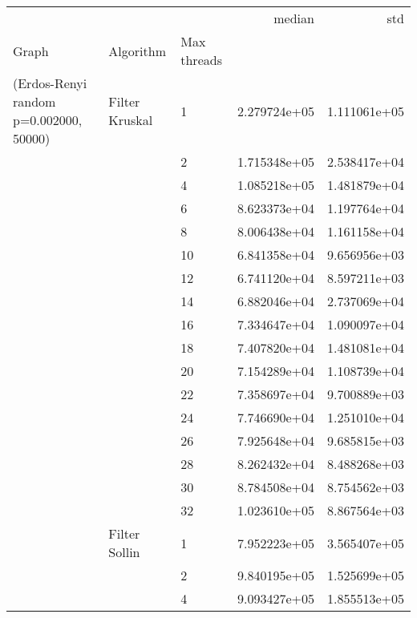 \begin{tabular}{lllrr}
\toprule
                      &            &    &        median &           std \\
Graph & Algorithm & Max threads &               &               \\
\midrule
(Erdos-Renyi random p=0.002000, 50000) & Filter Kruskal & 1  &  2.279724e+05 &  1.111061e+05 \\
                      &            & 2  &  1.715348e+05 &  2.538417e+04 \\
                      &            & 4  &  1.085218e+05 &  1.481879e+04 \\
                      &            & 6  &  8.623373e+04 &  1.197764e+04 \\
                      &            & 8  &  8.006438e+04 &  1.161158e+04 \\
                      &            & 10 &  6.841358e+04 &  9.656956e+03 \\
                      &            & 12 &  6.741120e+04 &  8.597211e+03 \\
                      &            & 14 &  6.882046e+04 &  2.737069e+04 \\
                      &            & 16 &  7.334647e+04 &  1.090097e+04 \\
                      &            & 18 &  7.407820e+04 &  1.481081e+04 \\
                      &            & 20 &  7.154289e+04 &  1.108739e+04 \\
                      &            & 22 &  7.358697e+04 &  9.700889e+03 \\
                      &            & 24 &  7.746690e+04 &  1.251010e+04 \\
                      &            & 26 &  7.925648e+04 &  9.685815e+03 \\
                      &            & 28 &  8.262432e+04 &  8.488268e+03 \\
                      &            & 30 &  8.784508e+04 &  8.754562e+03 \\
                      &            & 32 &  1.023610e+05 &  8.867564e+03 \\
                      & Filter Sollin & 1  &  7.952223e+05 &  3.565407e+05 \\
                      &            & 2  &  9.840195e+05 &  1.525699e+05 \\
                      &            & 4  &  9.093427e+05 &  1.855513e+05 \\

\end{tabular}
